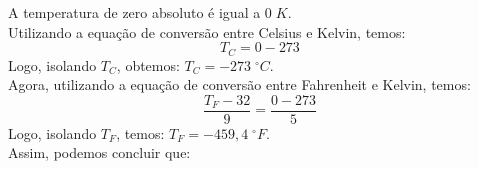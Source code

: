 %
%
	A temperatura de zero absoluto é igual a $0\;K$.\\Utilizando a equação de conversão entre Celsius e Kelvin, temos: \[T_{C}=0-273\] Logo, isolando $T_{C}$, obtemos: $T_{C}=-273\;^\circ C$.\\ Agora, utilizando a equação de conversão entre Fahrenheit e Kelvin, temos: \[\dfrac{T_{F}-32}{9}=\dfrac{0-273}{5}\] Logo, isolando $T_{F}$, temos: $T_{F}=-459,4\;^\circ F$.\\ Assim, podemos concluir que: 
